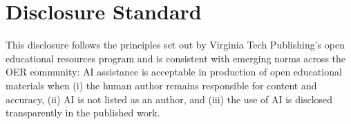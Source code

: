 \section*{Disclosure Standard}

This disclosure follows the principles set out by Virginia Tech
Publishing's open educational resources program and is consistent with
emerging norms across the OER community: AI assistance is acceptable
in production of open educational materials when (i) the human
author remains responsible for content and accuracy, (ii) AI is not
listed as an author, and (iii) the use of AI is disclosed
transparently in the published work.

\cleardoublepage
